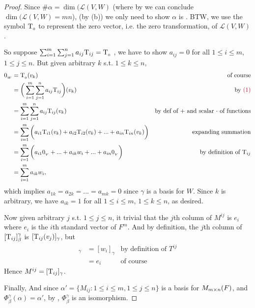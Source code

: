 \begin{proof}
Since \(\#\alpha = \dim(\mathcal{L}(V, W)\) (where by  we can conclude \(\dim(\mathcal{L}(V, W) = mn\)), (by (b)) we only need to show \(\alpha\) is \LID{}.
BTW, we use the symbol \(\mathrm{T}_{_0}\) to represent the zero vector, i.e. the zero transformation, of \(\mathcal{L}(V, W)\).

So suppose \(\sum_{i = 1}^{m} \sum_{j = 1}^n a_{ij} \mathrm{T}_{ij} = \mathrm{T}_{_0}\) , we have to show \(a_{ij} = 0\) for all \(1 \le i \le m\), \(1 \le j \le n\).
But given arbitrary \(k\) s.t. \(1 \le k \le n\),
\begin{align*}
    \OW & = \TZERO(v_k) & \text{of course} \\
        & = \bigg( \sum_{i = 1}^{m} \sum_{j = 1}^n a_{ij} \T_{ij} \bigg) (v_k) & \text{by \MAROON{(1)}} \\
        & = \sum_{i = 1}^{m} \sum_{j = 1}^n a_{ij} \T_{ij} (v_k) & \text{by def of \(+\) and scalar \(\cdot\) of functions} \\
        & = \sum_{i = 1}^{m} \bigg( a_{i1} \T_{i1} (v_k) + a_{i2} \T_{i2} (v_k) + ... + a_{in} \T_{in} (v_k) \bigg) & \text{expanding summation} \\
        & = \sum_{i = 1}^{m} \bigg( a_{i1} \OV + ... + a_{ik} w_i + ... + a_{in} \OV \bigg) & \text{by definition of \(\T_{ij}\)} \\
        & = \sum_{i = 1}^m a_{ik} w_i,
\end{align*}
which implies \(a_{1k} = a_{2k} = ... = a_{mk} = 0\) since \(\gamma\) is a basis for \(W\).
Since \(k\) is arbitrary, we have \(a_{ik} = 1\) for all \(1 \le i \le m\), \(1 \le k \le n\), as desired.

Now given arbitrary \(j\) s.t. \(1 \le j \le n\), it trivial that the \(j\)th column of \(M^{ij}\) is \(e_i\) where \(e_i\) is the \(i\)th standard vector of \(F^m\).
And by definition, the \(j\)th column of \([\mathrm{T}_{ij}]_{\beta}^{\gamma}\) is \([\mathrm{T}_{ij}(v_j)]_{\gamma}\), but
\begin{align*}
    [\T_{ij}(v_j)]_{\gamma} & = [w_i]_{\gamma} & \text{by definition of \(T^{ij}\)} \\
                 & = e_i & \text{of course}
\end{align*}
Hence \(M^{ij} = [\mathrm{T}_{ij}]_{\gamma}\).

Finally, And since \(\alpha' = \{ M_{ij} : 1 \le i \le m, 1 \le j \le n \}\) is a basis for \(M_{m \times n}(F)\), and \(\Phi_{\beta}^{\gamma}(\alpha) = \alpha'\), by , \(\Phi_{\beta}^{\gamma}\) is an isomorphism.
\end{proof}

